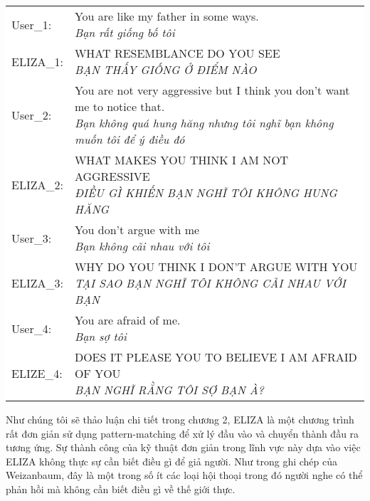 \vspace{0.15cm}
\hspace*{-1cm}
\colorbox{background}{
\begin{tabular}{ l l }
  User_1: & \makecell[l]{You are like my father in some ways. \vspace{-0.15cm} \\
    \scriptsize{\textit{Bạn rất giống bố tôi}}}  \\
  ELIZA_1: & \makecell[l]{WHAT RESEMBLANCE DO YOU SEE \vspace{-0.15cm} \\
    \scriptsize{\textit{BẠN THẤY GIỐNG Ở ĐIỂM NÀO}}} \\
  User_2: & \makecell[l]{You are not very aggressive but I think you don't want me to notice that. \vspace{-0.15cm} \\
    \scriptsize{\textit{Bạn không quá hung hăng nhưng tôi nghĩ bạn không muốn tôi để ý điều đó }}} \\
  ELIZA_2: & \makecell[l]{WHAT MAKES YOU THINK I AM NOT AGGRESSIVE \vspace{-0.15cm} \\
    \scriptsize{\textit{ĐIỀU GÌ KHIẾN BẠN NGHĨ TÔI KHÔNG HUNG HĂNG}}} \\
  User_3: & \makecell[l]{You don't argue with me \vspace{-0.15cm} \\
    \scriptsize{\textit{Bạn không cãi nhau với tôi}}} \\
  ELIZA_3: & \makecell[l]{WHY DO YOU THINK I DON'T ARGUE WITH YOU \vspace{-0.15cm} \\
    \scriptsize{\textit{TẠI SAO BẠN NGHĨ TÔI KHÔNG CÃI NHAU VỚI BẠN}}} \\
  User_4: & \makecell[l]{You are afraid of me. \vspace{-0.15cm} \\
    \scriptsize{\textit{Bạn sợ tôi}}} \\
  ELIZE_4: & \makecell[l]{DOES IT PLEASE YOU TO BELIEVE I AM AFRAID OF YOU \vspace{-0.15cm} \\
    \scriptsize{\textit{BẠN NGHĨ RẰNG TÔI SỢ BẠN À?}}}
\end{tabular}
}

Như chúng tôi sẽ thảo luận chi tiết trong chương 2, ELIZA là một chương trình rất đơn giản sử dụng pattern-matching để xử lý đầu vào và chuyển thành đầu ra tương ứng. Sự thành công của kỹ thuật đơn giản trong lĩnh vực này dựa vào việc ELIZA không thực sự cần biết điều gì để giả người. Như trong ghi chép của Weizanbaum, đây là một trong số ít các loại hội thoại trong đó người nghe có thể phản hồi mà không cần biết điều gì về thế giới thực.

